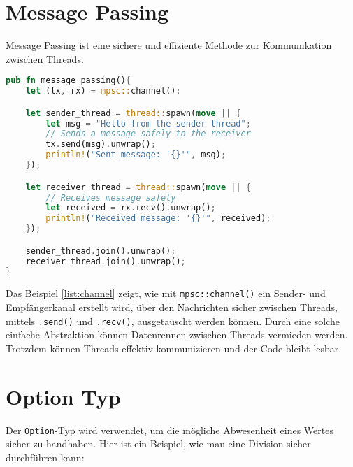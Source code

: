 \section{Message Passing}

Message Passing ist eine sichere und effiziente Methode zur Kommunikation zwischen Threads.

\begin{lstlisting}[language=Rust, caption=Message Passing ]
pub fn message_passing(){
    let (tx, rx) = mpsc::channel();

    let sender_thread = thread::spawn(move || {
        let msg = "Hello from the sender thread";
        // Sends a message safely to the receiver
        tx.send(msg).unwrap(); 
        println!("Sent message: '{}'", msg);
    });

    let receiver_thread = thread::spawn(move || {
        // Receives message safely
        let received = rx.recv().unwrap(); 
        println!("Received message: '{}'", received);
    });

    sender_thread.join().unwrap();
    receiver_thread.join().unwrap();
}
\end{lstlisting}
Das Beispiel \ref{list:channel} zeigt, wie mit \texttt{mpsc::channel()} ein Sender- und Empfängerkanal erstellt wird, über den Nachrichten sicher zwischen Threads, mittels \texttt{.send()} und \texttt{.recv()}, ausgetauscht werden können.
Durch eine solche einfache Abstraktion können Datenrennen zwischen Threads vermieden werden. 
Trotzdem können Threads effektiv kommunizieren und der Code bleibt lesbar.
\cleardoublepage
\section{Option Typ}

Der \texttt{Option}-Typ wird verwendet, um die mögliche Abwesenheit eines Wertes sicher zu handhaben. Hier ist ein Beispiel, wie man eine Division sicher durchführen kann:


